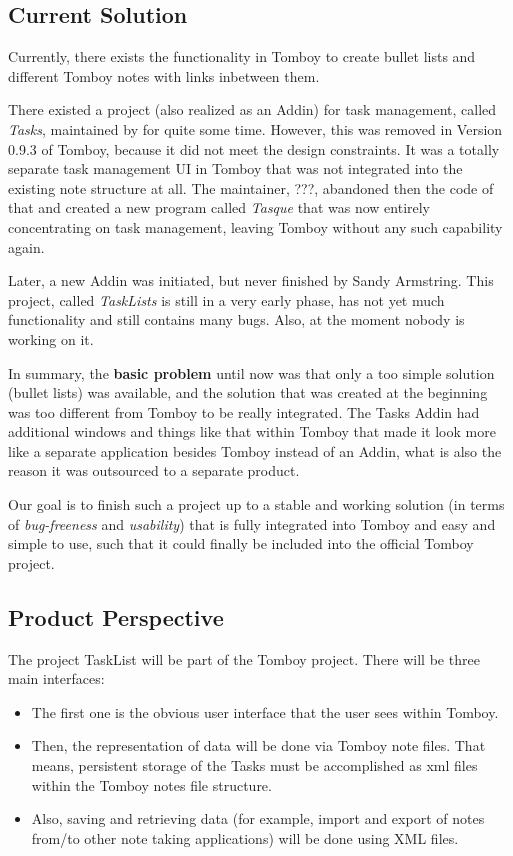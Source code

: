 \subsection{Current Solution}
\label{description:solution}

Currently, there exists the functionality in Tomboy to create bullet lists and different Tomboy notes with links inbetween them.

There existed a project (also realized as an Addin) for task management, called \textit{Tasks}, maintained by %
for quite some time. However, this was removed in Version 0.9.3 %
of Tomboy, because it did not meet the design constraints. It was a totally separate task management UI in Tomboy that was not integrated into the existing note structure at all. The maintainer, ???, abandoned then the code of that and created a new program called \textit{Tasque} that was now entirely concentrating on task management, leaving Tomboy without any such capability again.

Later, a new Addin was initiated, but never finished by Sandy Armstring. This project, called \textit{TaskLists} is still in a very early phase, has not yet much functionality and still contains many bugs. Also, at the moment nobody is working on it.

In summary, the \textbf{basic problem} until now was that only a too simple solution (bullet lists) was available, and the solution that was created at the beginning was too different from Tomboy to be really integrated. The Tasks Addin had additional windows and things like that within Tomboy that made it look more like a separate application besides Tomboy instead of an Addin, what is also the reason it was outsourced to a separate product.

Our goal is to finish such a project up to a stable and working solution (in terms of \textit{bug-freeness} and \textit{usability}) that is fully integrated into Tomboy and easy and simple to use, such that it could finally be included into the official Tomboy project.

\subsection{Product Perspective}
\label{description:perspective}
  The project TaskList will be part of the Tomboy project. There will be three main interfaces:

  \begin{itemize}
    \item The first one is the obvious user interface that the user sees within Tomboy.
    \item Then, the representation of data will be done via Tomboy note files. That means, persistent storage of the Tasks must be accomplished as xml files within the Tomboy notes file structure.
    \item Also, saving and retrieving data (for example, import and export of notes from/to other note taking applications) will be done using XML files.
  \end{itemize}

